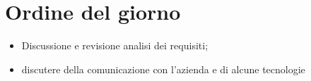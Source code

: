 \section{Ordine del giorno}

\begin{itemize}
    \item Discussione e revisione analisi dei requisiti;
    \item discutere della comunicazione con l'azienda e di alcune tecnologie
\end{itemize}